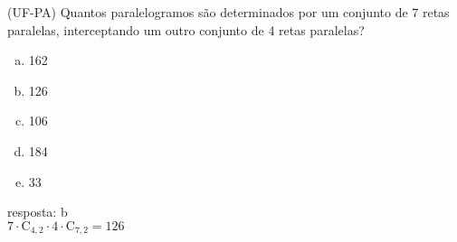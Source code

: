 \begin{ex}
 (UF-PA) Quantos paralelogramos são determinados por um conjunto de 7 retas paralelas, interceptando um outro conjunto de 4 retas paralelas?
    \begin{enumerate}[(a)]
    \item 162
    \item 126
    \item 106
    \item 184
    \item 33
    \end{enumerate}
      \begin{sol}
       resposta: b \\
       $7\cdot \mathrm{C}_{4,2}\cdot4\cdot\mathrm{C}_{7,2}=126$
      \end{sol}
\end{ex}